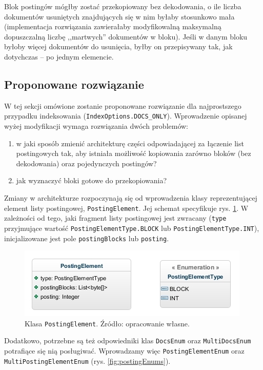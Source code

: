 Blok postingów mógłby zostać przekopiowany bez dekodowania, o ile liczba dokumentów usuniętych znajdujących się w nim byłaby stosunkowo mała (implementacja rozwiązania zawierałaby modyfikowalną maksymalną dopuszczalną liczbę ,,martwych'' dokumentów w bloku). Jeśli w danym bloku byłoby więcej dokumentów do usunięcia, byłby on przepisywany tak, jak dotychczas -- po jednym elemencie.

\subsection{Proponowane rozwiązanie}
\label{sec:solution}

W tej sekcji omówione zostanie proponowane rozwiązanie dla najprostszego przypadku indeksowania (\texttt{IndexOptions.DOCS\_ONLY}). Wprowadzenie opisanej wyżej modyfikacji wymaga rozwiązania dwóch problemów:
\begin{enumerate}
 \item w jaki sposób zmienić architekturę części odpowiadającej za łączenie list postingowych tak, aby istniała możliwość kopiowania zarówno bloków (bez dekodowania) oraz pojedynczych postingów?
 \item jak wyznaczyć bloki gotowe do przekopiowania?
\end{enumerate}

Zmiany w architekturze rozpoczynają się od wprowadzenia klasy reprezentującej element listy postingowej, \texttt{PostingElement}. Jej schemat specyfikuje rys. \ref{fig:postingElement}. W zależności od tego, jaki fragment listy postingowej jest zwracany (\texttt{type} przyjmujące wartość \texttt{PostingElementType.BLOCK} lub \texttt{PostingElementType.INT}), inicjalizowane jest pole \texttt{postingBlocks} lub \texttt{posting}.

\begin{figure}[here]
 \includegraphics[scale=0.7]{pictures/PostingElement.jpg}
 \caption{Klasa \texttt{PostingElement}. Źródło: opracowanie własne. \label{fig:postingElement}}
\end{figure}

Dodatkowo, potrzebne są też odpowiedniki klas \texttt{DocsEnum} oraz \texttt{MultiDocsEnum} potrafiące się nią posługiwać. Wprowadzamy więc \texttt{PostingElementEnum} oraz \texttt{MultiPostingElementEnum} (rys. \ref{fig:postingEnums}).

